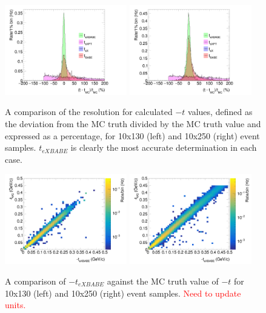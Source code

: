 \documentclass[letterpaper,12pt]{article}
\begin{document}
\begin{figure}[h]
    \centering
    \includegraphics[width=0.475\textwidth]{Figures/10on130_tComp.png}
    \includegraphics[width=0.475\textwidth]{Figures/10on250_tComp.png}
    \caption{A comparison of the resolution for calculated $-t$ values, defined as the deviation from the MC truth divided by the MC truth value and expressed as a percentage, for 10x130 (left) and 10x250 (right) event samples. $t_{eXBABE}$ is clearly the most accurate determination in each case.}
\label{fig:t_Comp}
\end{figure}

\begin{figure}[h]
    \centering
    \includegraphics[width=0.475\textwidth]{Figures/10on130_tCompAlt_ZDC.png}
    \includegraphics[width=0.475\textwidth]{Figures/10on250_tCompAlt_ZDC.png}
    \caption{A comparison of $-t_{eXBABE}$ against the MC truth value of $-t$ for 10x130 (left) and 10x250 (right) event samples. \textcolor{red}{Need to update units.}}
\label{fig:teXBABE_Comp}
\end{figure}
\end{document}
